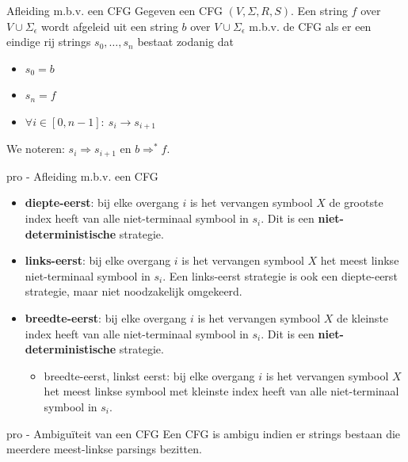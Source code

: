 \begin{theo}{Afleiding m.b.v. een CFG}
    Gegeven een CFG $(V, \Sigma, R, S)$. Een string $f$ over $V \cup \Sigma_{\epsilon}$ wordt afgeleid uit een string $b$ over $V \cup \Sigma_{\epsilon}$ 
    m$.$b$.$v$.$ de CFG als er een eindige rij strings $s_0, \ldots, s_n$ bestaat zodanig dat
    \begin{itemize}
        \item $s_0 = b$
        \item $s_n = f$
        \item $\forall i \in [0,n-1]: \ s_i \to s_{i+1}$
    \end{itemize} 
    We noteren: $s_i \Rightarrow s_{i+1}$ en $b \Rightarrow^* f$. 
    \vspace{-0.1cm}
\end{theo}

\begin{pro}{pro - Afleiding m.b.v. een CFG}
    \begin{itemize}
        \item \textbf{diepte-eerst}: bij elke overgang $i$ is het vervangen symbool $X$ de grootste index heeft van alle niet-terminaal symbool in $s_i$. Dit is een \textbf{niet-deterministische} strategie.
        \item \textbf{links-eerst}: bij elke overgang $i$ is het vervangen symbool $X$ het meest linkse niet-terminaal symbool in $s_i$. Een links-eerst strategie is ook een diepte-eerst strategie, maar niet noodzakelijk omgekeerd.
        \item \textbf{breedte-eerst}: bij elke overgang $i$ is het vervangen symbool $X$ de kleinste index heeft van alle niet-terminaal symbool in $s_i$. Dit is een \textbf{niet-deterministische} strategie.
        \begin{itemize}
            \item breedte-eerst, linkst eerst: bij elke overgang $i$ is het vervangen symbool $X$ het meest linkse symbool met kleinste index heeft van alle niet-terminaal symbool in $s_i$.
        \end{itemize}
    \end{itemize}
    \vspace{-0.2cm}
\end{pro}

\begin{pro}{pro - Ambiguïteit van een CFG}
    \vspace{-0.1cm}
    Een CFG is ambigu indien er strings bestaan die meerdere meest-linkse parsings bezitten.
    \vspace{-0.1cm}
\end{pro}

